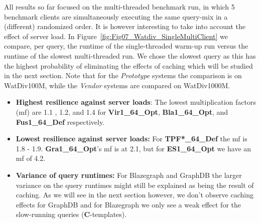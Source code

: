 
%
All results so far focused on the multi-threaded benchmark run, in which 5 benchmark clients are simultaneously executing the same query-mix in a (different) randomized order. It is however interesting to take into account the effect of server load. In Figure~\ref{fig:Fig07_Watdiv_SingleMultiClient} we compare, per query, the runtime of the single-threaded warm-up run versus the runtime of the slowest multi-threaded run. We chose the slowest query as this has the highest probability of eliminating the effects of caching which will be studied in the next section. Note that for the \emph{Prototype} systems the comparison is on WatDiv100M, while the \emph{Vendor} systems are compared on WatDiv1000M.


\begin{itemize}
	\item \textbf{Highest resilience against server loads}: The lowest multiplication factors (mf) are 1.1 , 1.2, and 1.4 for \textbf{Vir1\_64\_Opt}, \textbf{Bla1\_64\_Opt}, and \textbf{Fus1\_64\_Def} respectively. 
	 
	\item \textbf{Lowest resilience against server loads:} For \textbf{TPF*\_64\_Def} the mf is 1.8 - 1.9.  \textbf{Gra1\_64\_Opt}'s mf is at 2.1, but for \textbf{ES1\_64\_Opt} we have an mf of 4.2.
	
	\item \textbf{Variance of query runtimes:} For Blazegraph and GraphDB the larger variance on the query runtimes might still be explained as being the result of caching. As we will see in the next section however, we don't observe caching effects for GraphDB and for Blazegraph we only see a weak effect for the slow-running queries (\textbf{C}-templates).
\end{itemize}
